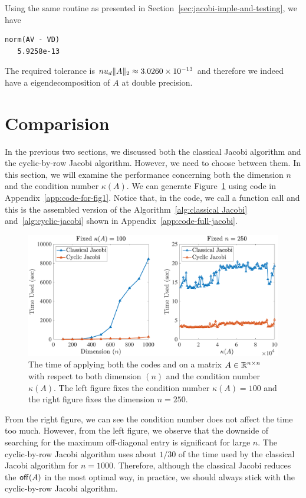 Using the same routine as presented in Section~\ref{sec:jacobi-imple-and-testing}, we have 
\begin{lstlisting}
norm(AV - VD)
   5.9258e-13
\end{lstlisting}
The required tolerance is $nu_d\|{A}\|_2 \approx 3.0260\times 10^{-13}$ and therefore we indeed have a eigendecomposition of $A$ at double precision.

\section{Comparision}

In the previous two sections, we discussed both the classical Jacobi algorithm and the cyclic-by-row Jacobi algorithm. However, we need to choose between them. In this section, we will examine the performance concerning both the dimension $n$ and the condition number $\kappa(A)$. We can generate Figure~\ref{fig:classical-cyclic-compare} using code in Appendix~\ref{app:code-for-fig1}. Notice that, in the code, we call a function call  and this is the assembled version of the Algorithm~\ref{alg:classical Jacobi} and~\ref{alg:cyclic-jacobi} shown in Appendix~\ref{app:code-full-jacobi}.

\begin{figure}[ht]
\centering
\includegraphics[width=1\textwidth]{figs/classical-cyclic-compare.pdf}
\caption[The time of applying both the classical and the cyclic-by-row Jacobi algorithm on matrix $A\in\R\nn$ with respect to both the dimension $(n)$ and the condition number $\kappa(A)$.]{The time of applying both the codes  and  on a matrix $A\in\R\nn$ with respect to both dimension $(n)$ and the condition number $\kappa(A)$. The left figure fixes the condition number $\kappa(A) = 100$ and the right figure fixes the dimension $n = 250$.}
\label{fig:classical-cyclic-compare}
\end{figure}

From the right figure, we can see the condition number does not affect the time too much. However, from the left figure, we observe that the downside of searching for the maximum off-diagonal entry is significant for large $n$. The cyclic-by-row Jacobi algorithm uses about $1/30$ of the time used by the classical Jacobi algorithm for $n = 1000$. Therefore, although the classical Jacobi reduces the $\mathsf{off}(A)$ in the most optimal way, in practice, we should always stick with the cyclic-by-row Jacobi algorithm.